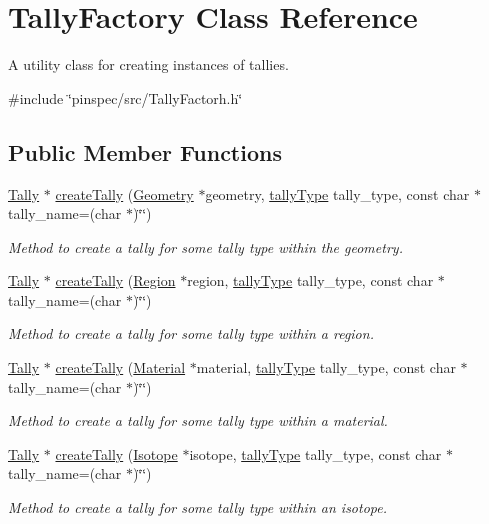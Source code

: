 \hypertarget{classTallyFactory}{\section{Tally\-Factory Class Reference}
\label{classTallyFactory}
}


A utility class for creating instances of tallies.  




{\ttfamily \#include \char`\"{}pinspec/src/\-Tally\-Factorh.\-h\char`\"{}}

\subsection*{Public Member Functions}
\begin{DoxyCompactItemize}
\item 
\hyperlink{classTally}{Tally} $\ast$ \hyperlink{classTallyFactory_af867d20139f3e667cb4888be750ce1af}{create\-Tally} (\hyperlink{classGeometry}{Geometry} $\ast$geometry, \hyperlink{Tally_8h_ad9b32b34ff6309e7781de583a9fa3a81}{tally\-Type} tally\-\_\-type, const char $\ast$tally\-\_\-name=(char $\ast$)\char`\"{}\char`\"{})
\begin{DoxyCompactList}\small\item\em Method to create a tally for some tally type within the geometry. \end{DoxyCompactList}\item 
\hyperlink{classTally}{Tally} $\ast$ \hyperlink{classTallyFactory_adc2544df5d156100a3d2dfe529bd3bab}{create\-Tally} (\hyperlink{classRegion}{Region} $\ast$region, \hyperlink{Tally_8h_ad9b32b34ff6309e7781de583a9fa3a81}{tally\-Type} tally\-\_\-type, const char $\ast$tally\-\_\-name=(char $\ast$)\char`\"{}\char`\"{})
\begin{DoxyCompactList}\small\item\em Method to create a tally for some tally type within a region. \end{DoxyCompactList}\item 
\hyperlink{classTally}{Tally} $\ast$ \hyperlink{classTallyFactory_a8ae1ea758bd5e8dc61247e76629d6d06}{create\-Tally} (\hyperlink{classMaterial}{Material} $\ast$material, \hyperlink{Tally_8h_ad9b32b34ff6309e7781de583a9fa3a81}{tally\-Type} tally\-\_\-type, const char $\ast$tally\-\_\-name=(char $\ast$)\char`\"{}\char`\"{})
\begin{DoxyCompactList}\small\item\em Method to create a tally for some tally type within a material. \end{DoxyCompactList}\item 
\hyperlink{classTally}{Tally} $\ast$ \hyperlink{classTallyFactory_ab991a59aabd67c38a36506c3966aa0f1}{create\-Tally} (\hyperlink{classIsotope}{Isotope} $\ast$isotope, \hyperlink{Tally_8h_ad9b32b34ff6309e7781de583a9fa3a81}{tally\-Type} tally\-\_\-type, const char $\ast$tally\-\_\-name=(char $\ast$)\char`\"{}\char`\"{})
\begin{DoxyCompactList}\small\item\em Method to create a tally for some tally type within an isotope. \end{DoxyCompactList}\end{DoxyCompactItemize}
